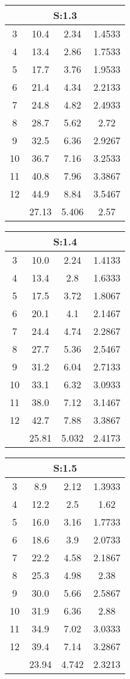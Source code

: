 
\begin{table}[H]
\begin{tabular}{c|ccc}
\multicolumn{4}{c}{S:1.3}\\\hline
3 & 10.4 & 2.34 & 1.4533\\
4 & 13.4 & 2.86 & 1.7533\\
5 & 17.7 & 3.76 & 1.9533\\
6 & 21.4 & 4.34 & 2.2133\\
7 & 24.8 & 4.82 & 2.4933\\
8 & 28.7 & 5.62 & 2.72\\
9 & 32.5 & 6.36 & 2.9267\\
10 & 36.7 & 7.16 & 3.2533\\
11 & 40.8 & 7.96 & 3.3867\\
12 & 44.9 & 8.84 & 3.5467\\
\hline
& 27.13 & 5.406 & 2.57\\
\end{tabular}
\end{table}
\begin{table}[H]
\begin{tabular}{c|ccc}
\multicolumn{4}{c}{S:1.4}\\\hline
3 & 10.0 & 2.24 & 1.4133\\
4 & 13.4 & 2.8 & 1.6333\\
5 & 17.5 & 3.72 & 1.8067\\
6 & 20.1 & 4.1 & 2.1467\\
7 & 24.4 & 4.74 & 2.2867\\
8 & 27.7 & 5.36 & 2.5467\\
9 & 31.2 & 6.04 & 2.7133\\
10 & 33.1 & 6.32 & 3.0933\\
11 & 38.0 & 7.12 & 3.1467\\
12 & 42.7 & 7.88 & 3.3867\\
\hline
& 25.81 & 5.032 & 2.4173\\
\end{tabular}
\end{table}
\begin{table}[H]
\begin{tabular}{c|ccc}
\multicolumn{4}{c}{S:1.5}\\\hline
3 & 8.9 & 2.12 & 1.3933\\
4 & 12.2 & 2.5 & 1.62\\
5 & 16.0 & 3.16 & 1.7733\\
6 & 18.6 & 3.9 & 2.0733\\
7 & 22.2 & 4.58 & 2.1867\\
8 & 25.3 & 4.98 & 2.38\\
9 & 30.0 & 5.66 & 2.5867\\
10 & 31.9 & 6.36 & 2.88\\
11 & 34.9 & 7.02 & 3.0333\\
12 & 39.4 & 7.14 & 3.2867\\
\hline
& 23.94 & 4.742 & 2.3213\\
\end{tabular}
\end{table}
